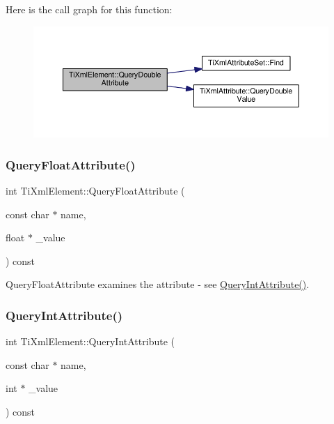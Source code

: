 Here is the call graph for this function\+:\nopagebreak
\begin{figure}[H]
\begin{center}
\leavevmode
\includegraphics[width=350pt]{class_ti_xml_element_ae04bad29ddb281a7e6c662b3882e9928_cgraph}
\end{center}
\end{figure}
\mbox{\label{class_ti_xml_element_a5591929834178699b4561ab6ab460068}} 
\subsubsection{\texorpdfstring{Query\+Float\+Attribute()}{QueryFloatAttribute()}}
{\footnotesize\ttfamily int Ti\+Xml\+Element\+::\+Query\+Float\+Attribute (\begin{DoxyParamCaption}\item[{const char $\ast$}]{name,  }\item[{float $\ast$}]{\+\_\+value }\end{DoxyParamCaption}) const\hspace{0.3cm}{\ttfamily [inline]}}



Query\+Float\+Attribute examines the attribute -\/ see \hyperlink{class_ti_xml_element_a5c0f739e0f6f5905a201364532e54a60}{Query\+Int\+Attribute()}. 

\mbox{\label{class_ti_xml_element_a5c0f739e0f6f5905a201364532e54a60}} 
\subsubsection{\texorpdfstring{Query\+Int\+Attribute()}{QueryIntAttribute()}}
{\footnotesize\ttfamily int Ti\+Xml\+Element\+::\+Query\+Int\+Attribute (\begin{DoxyParamCaption}\item[{const char $\ast$}]{name,  }\item[{int $\ast$}]{\+\_\+value }\end{DoxyParamCaption}) const}

